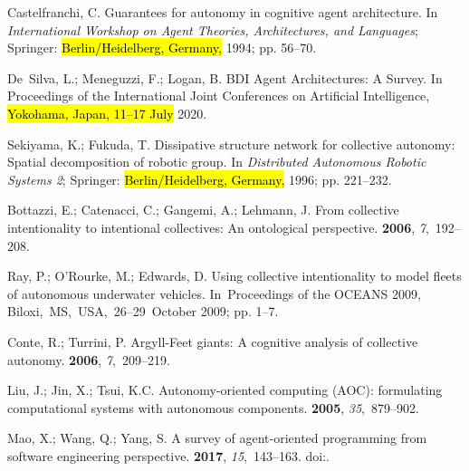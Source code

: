 \documentclass[jsan,article,accept,moreauthors,pdftex]{Definitions/mdpi}
\begin{document}
\begin{thebibliography}{999}
Castelfranchi, C.
\newblock Guarantees for autonomy in cognitive agent architecture.
\newblock   In \emph{International Workshop on Agent Theories, Architectures, and Languages}; Springer: \hl{Berlin/Heidelberg, Germany,}  1994; pp. 56--70.

De~Silva, L.; Meneguzzi, F.; Logan, B.
\newblock BDI Agent Architectures: A Survey.
\newblock  In Proceedings of the International Joint Conferences on Artificial Intelligence, \hl{Yokohama, Japan, 11--17 July} 2020.

Sekiyama, K.; Fukuda, T.
\newblock Dissipative structure network for collective autonomy: Spatial
  decomposition of robotic group. In {\em Distributed Autonomous Robotic
  Systems 2}; Springer: \hl{Berlin/Heidelberg, Germany,} 1996; pp. 221--232.

Bottazzi, E.; Catenacci, C.; Gangemi, A.; Lehmann, J.
\newblock From collective intentionality to intentional collectives: An
  ontological perspective.
 {\bf 2006}, {\em 7},~192--208.

Ray, P.; O'Rourke, M.; Edwards, D.
\newblock Using collective intentionality to model fleets of autonomous
  underwater vehicles.
\newblock  In~Proceedings of the OCEANS 2009, \mbox{Biloxi, MS, USA, 26--29 October} 2009; pp. 1--7.

Conte, R.; Turrini, P.
\newblock Argyll-Feet giants: {A} cognitive analysis of collective autonomy.
 {\bf 2006}, {\em 7},~209--219.

Liu, J.; Jin, X.; Tsui, K.C.
\newblock Autonomy-oriented computing {(AOC):} formulating computational
  systems with autonomous components.
 {\bf 2005}, {\em
  35},~879--902.

Mao, X.; Wang, Q.; Yang, S.
\newblock A survey of agent-oriented programming from software engineering
  perspective.
 {\bf 2017}, {\em 15},~143--163.
\newblock
  doi:{\href{https://doi.org/10.3233/WEB-170357}{}}.


\end{thebibliography}
\end{document}
